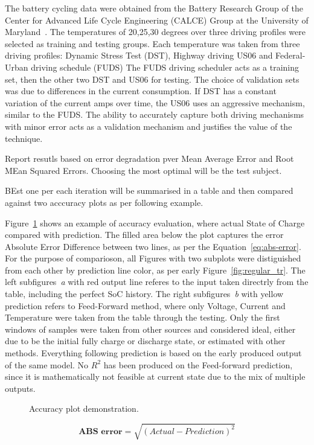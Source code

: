 The battery cycling data were obtained from the Battery Research Group of the
Center for Advanced Life Cycle Engineering (CALCE) Group
at the University of Maryland~\cite{noauthor_calce_2017}.
The temperatures of 20,25,30 degrees over three driving profiles were selected as training and testing groups.
Each temperature was taken from three driving profiles: Dynamic Stress Test (DST), Highway driving US06 and Federal-Urban driving schedule (FUDS)
The FUDS driving scheduler acts as a training set, then the other two DST and US06 for testing.
The choice of validation sets was due to differences in the current consumption.
If DST has a constant variation of the current amps over time, the US06 uses an aggressive mechanism, similar to the FUDS.
The ability to accurately capture both driving mechanisms with minor error acts as a validation mechanism and justifies the value of the technique.

%
%
Report resutls based on error degradation pver Mean Average Error and Root MEan Squared Errors.
Choosing the most optimal will be the test subject.

%
%
BEst one per each iteration will be summarised in a table and then compared against two acccuracy plots as per following example.

%
%
Figure~\ref{fig:plot_demo} shows an example of accuracy evaluation, where actual State of Charge compared with prediction.
The filled area below the plot captures the error Absolute Error Difference between two lines, as per the Equation~\ref{eq:abs-error}.
For the purpose of comparioson, all Figures with two subplots were distiguished from each other by prediction line color, as per early Figure~\ref{fig:regular_tr}.
The left subfigures~\textit{a} with red output line referes to the input taken directrly from the table, including the perfect SoC history.
The right subfigures~\textit{b} with yellow prediction refers to Feed-Forward method, where only Voltage, Current and Temperature were taken from the table through the testing.
Only the first windows of samples were taken from other sources and considered ideal, either due to be the initial fully charge or discharge state, or estimated with other methods.
Everything following prediction is based on the early produced output of the same model.
No $R^2$ has been produced on the Feed-forward prediction, since it is mathematically not feasible at current state due to the mix of multiple outputs.
\begin{figure}[ht]
    \centering
    
    \caption{Accuracy plot demonstration.}
    \label{fig:plot_demo}
\end{figure}
\begin{equation}
    \textbf{ABS error}  = \sqrt{(Actual-Prediction)^2}
    \label{eq:abs-error}
\end{equation}